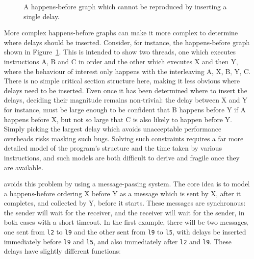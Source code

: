 \begin{figure}
  \caption{A happens-before graph which cannot be reproduced by
    inserting a single delay.}
  \label{fig:enforce_crash:complex_hb}
\end{figure}

More complex happens-before graphs can make it more complex to
determine where delays should be inserted.  Consider, for instance,
the happens-before graph shown in
Figure~\ref{fig:enforce_crash:complex_hb}.  This is intended to show
two threads, one which executes instructions A, B and C in order and
the other which executes X and then Y, where the behaviour of interest
only happens with the interleaving A, X, B, Y, C.  There is no simple
critical section structure here, making it less obvious where delays
need to be inserted.  Even once it has been determined where to insert
the delays, deciding their magnitude remains non-trivial: the delay
between X and Y for instance, must be large enough to be confident
that B happens before Y if A happens before X, but not so large that C
is also likely to happen before Y.  Simply picking the largest delay
which avoids unacceptable performance overheads risks masking such
bugs.  Solving such constraints requires a far more detailed model of
the program's structure and the time taken by various instructions,
and such models are both difficult to derive and fragile once they are
available.

{\Technique} avoids this problem by using a message-passing system.
The core idea is to model a happens-before ordering X before Y as a
message which is sent by X, after it completes, and collected by Y,
before it starts.  These messages are synchronous: the sender will
wait for the receiver, and the receiver will wait for the sender, in
both cases with a short timeout.  In the first example, there will be
two messages, one sent from \verb|l2| to \verb|l9| and the other sent
from \verb|l9| to \verb|l5|, with delays be inserted immediately
before \verb|l9| and \verb|l5|, and also immediately after \verb|l2|
and \verb|l9|.  These delays have slightly different functions:


